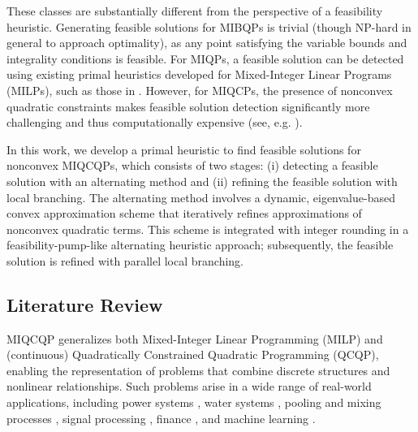 \documentclass[]{article}
\begin{document}
These classes are substantially different from the perspective of a feasibility heuristic. Generating feasible solutions for MIBQPs is trivial (though NP-hard in general to approach optimality), as any point satisfying the variable bounds and integrality conditions is feasible. For MIQPs, a feasible solution can be detected using existing primal heuristics developed for Mixed-Integer Linear Programs (MILPs), such as those in \cite{fischetti2005feasibility,fischetti2003local,pisinger2018large}. However, for MIQCPs, the presence of nonconvex quadratic constraints makes feasible solution detection significantly more challenging and thus computationally expensive (see, e.g. \cite{wiese2021computational}). 

In this work, we develop a primal heuristic to find feasible solutions for nonconvex MIQCQPs, which consists of two stages: (i) detecting a feasible solution with an alternating method and (ii) refining the feasible solution with local branching. The alternating method involves a dynamic, eigenvalue-based convex approximation scheme that iteratively refines approximations of nonconvex quadratic terms. This scheme is integrated with integer rounding in a feasibility-pump-like alternating heuristic approach; subsequently, the feasible solution is refined with parallel local branching.

\subsection{Literature Review}
MIQCQP generalizes both Mixed-Integer Linear Programming (MILP) and (continuous) Quadratically Constrained Quadratic Programming (QCQP), enabling the representation of problems that combine discrete structures and nonlinear relationships. Such problems arise in a wide range of real-world applications, including power systems \cite{bai2015decomposition,liu2018global}, water systems \cite{faria2011novel}, pooling and mixing processes \cite{castro2016source,beach2020approximate}, signal processing \cite{pan2021joint}, finance \cite{cui2013convex}, and machine learning \cite{bertsimas2009algorithm}. 
\end{document}
